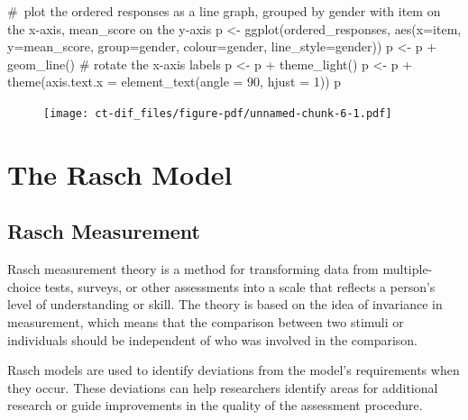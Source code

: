 \documentclass[
  letterpaper,
  DIV=11,
  numbers=noendperiod]{scrreprt}
\newenvironment{Shaded}{\begin{snugshade}}{\end{snugshade}}
\newcommand{\AttributeTok}[1]{\textcolor[rgb]{0.40,0.45,0.13}{#1}}
\newcommand{\CommentTok}[1]{\textcolor[rgb]{0.37,0.37,0.37}{#1}}
\newcommand{\DecValTok}[1]{\textcolor[rgb]{0.68,0.00,0.00}{#1}}
\newcommand{\FunctionTok}[1]{\textcolor[rgb]{0.28,0.35,0.67}{#1}}
\newcommand{\NormalTok}[1]{\textcolor[rgb]{0.00,0.23,0.31}{#1}}
\newcommand{\OtherTok}[1]{\textcolor[rgb]{0.00,0.23,0.31}{#1}}
\newcommand{\SpecialCharTok}[1]{\textcolor[rgb]{0.37,0.37,0.37}{#1}}
\begin{document}
\begin{Shaded}
\begin{Highlighting}[]
\CommentTok{\# plot the ordered responses as a line graph, grouped by gender with item on the x{-}axis, mean\_score on the y{-}axis}
\NormalTok{p }\OtherTok{\textless{}{-}} \FunctionTok{ggplot}\NormalTok{(ordered\_responses, }\FunctionTok{aes}\NormalTok{(}\AttributeTok{x=}\NormalTok{item, }\AttributeTok{y=}\NormalTok{mean\_score, }\AttributeTok{group=}\NormalTok{gender, }\AttributeTok{colour=}\NormalTok{gender, }\AttributeTok{line\_style=}\NormalTok{gender))}
\NormalTok{p }\OtherTok{\textless{}{-}}\NormalTok{ p }\SpecialCharTok{+} \FunctionTok{geom\_line}\NormalTok{() }\CommentTok{\# rotate the x{-}axis labels}
\NormalTok{p }\OtherTok{\textless{}{-}}\NormalTok{ p }\SpecialCharTok{+} \FunctionTok{theme\_light}\NormalTok{()}
\NormalTok{p }\OtherTok{\textless{}{-}}\NormalTok{ p }\SpecialCharTok{+} \FunctionTok{theme}\NormalTok{(}\AttributeTok{axis.text.x =} \FunctionTok{element\_text}\NormalTok{(}\AttributeTok{angle =} \DecValTok{90}\NormalTok{, }\AttributeTok{hjust =} \DecValTok{1}\NormalTok{))}
\NormalTok{p}
\end{Highlighting}
\end{Shaded}

\begin{figure}[H]

{\centering \texttt{[image: ct-dif\_files/figure-pdf/unnamed-chunk-6-1.pdf]}

}

\end{figure}

\part{The Rasch Model}

\hypertarget{rasch-measurement}{%
\chapter{Rasch Measurement}\label{rasch-measurement}}

Rasch measurement theory is a method for transforming data from
multiple-choice tests, surveys, or other assessments into a scale that
reflects a person's level of understanding or skill. The theory is based
on the idea of invariance in measurement, which means that the
comparison between two stimuli or individuals should be independent of
who was involved in the comparison.

Rasch models are used to identify deviations from the model's
requirements when they occur. These deviations can help researchers
identify areas for additional research or guide improvements in the
quality of the assessment procedure.
\end{document}
